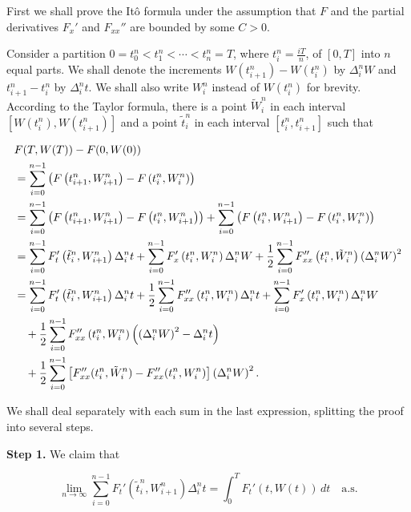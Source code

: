 \begin{Proof}
First we shall prove the Itô formula under the assumption that $F$ and the partial derivatives $F_x'$ and $F_{xx}''$ are bounded by some $C > 0$.

Consider a partition $0 = t_0^n < t_1^n < \cdots < t_n^n = T$, where $t_i^n = \frac{iT}{n}$, of $[0, T]$ into $n$ equal parts. We shall denote the increments $W(t_{i+1}^n) - W(t_i^n)$ by $\Delta_i^n W$ and $t_{i+1}^n - t_i^n$ by $\Delta_i^n t$. We shall also write $W_i^n$ instead of $W(t_i^n)$ for brevity. According to the Taylor formula, there is a point $\tilde{W}_i^n$ in each interval $[W(t_i^n), W(t_{i+1}^n)]$ and a point $\tilde{t}_i^n$ in each interval $[t_i^n, t_{i+1}^n]$ such that

\begin{align}
& F(T, W(T)) - F(0, W(0)) \notag \\
& = \sum_{i=0}^{n-1} \left(F\left(t_{i+1}^n, W_{i+1}^n\right) - F\left(t_i^n, W_i^n\right)\right) \notag \\
& = \sum_{i=0}^{n-1} \left(F\left(t_{i+1}^n, W_{i+1}^n\right) - F\left(t_i^n, W_{i+1}^n\right)\right) + \sum_{i=0}^{n-1} \left(F\left(t_i^n, W_{i+1}^n\right) - F\left(t_i^n, W_i^n\right)\right) \label{eq:TaylorStep1} \\
& = \sum_{i=0}^{n-1} F_t'\left(\tilde{t}_i^n, W_{i+1}^n\right) \Delta_i^n t + \sum_{i=0}^{n-1} F_x'\left(t_i^n, W_i^n\right) \Delta_i^n W + \frac{1}{2} \sum_{i=0}^{n-1} F_{xx}''\left(t_i^n, \tilde{W}_i^n\right) \left(\Delta_i^n W\right)^2 \label{eq:TaylorStep2} \\
& = \sum_{i=0}^{n-1} F_t'\left(\tilde{t}_i^n, W_{i+1}^n\right) \Delta_i^n t + \frac{1}{2} \sum_{i=0}^{n-1} F_{xx}''\left(t_i^n, W_i^n\right) \Delta_i^n t + \sum_{i=0}^{n-1} F_x'\left(t_i^n, W_i^n\right) \Delta_i^n W \label{eq:TaylorStep3} \\
& \quad + \frac{1}{2} \sum_{i=0}^{n-1} F_{xx}''\left(t_i^n, W_i^n\right) \left(\left(\Delta_i^n W\right)^2 - \Delta_i^n t\right) \label{eq:TaylorStep4} \\
& \quad + \frac{1}{2} \sum_{i=0}^{n-1} \left[F_{xx}''(t_i^n, \tilde{W}_i^n) - F_{xx}''(t_i^n, W_i^n)\right] \left(\Delta_i^n W\right)^2. \label{eq:TaylorStep5}
\end{align}

We shall deal separately with each sum in the last expression, splitting the proof into several steps.

\medskip\noindent\textbf{Step 1.} We claim that

\begin{equation}
\lim_{n \to \infty} \sum_{i=0}^{n-1} F_t'\left(\tilde{t}_i^n, W_{i+1}^n\right) \Delta_i^n t = \int_0^T F_t'(t, W(t)) \, dt \quad \text{a.s.}
\end{equation}


\end{Proof}
